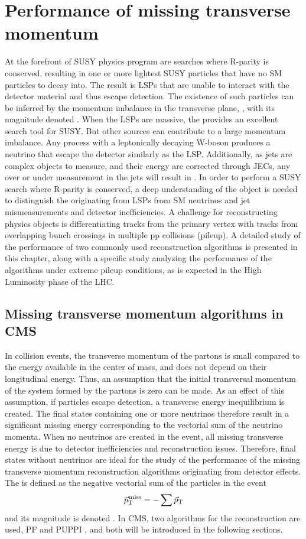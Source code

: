 \chapter{Performance of missing transverse momentum}\label{sec:met}
At the forefront of SUSY physics program are searches where R-parity is conserved, resulting in one or more lightest SUSY particles that have no SM particles to decay into. 
The result is LSPs that are unable to interact with the detector material and thus escape detection.
The existence of such particles can be inferred by the momentum imbalance in the transverse plane, \ptvecmiss, with its magnitude denoted \ptmiss. 
When the LSPs are massive, the \ptmiss provides an excellent search tool for SUSY. But other sources can contribute to a large momentum imbalance. 
Any process with a leptonically decaying W-boson produces a neutrino that escape the detector similarly as the LSP. 
Additionally, as jets are complex objects to measure, and their energy are corrected through JECs, any over or under measurement in the jets will result in \ptmiss. 
In order to perform a SUSY search where R-parity is conserved, a deep understanding of the \ptmiss object is needed to distinguish the \ptmiss originating from LSPs from SM neutrinos and jet mismeasurements and detector inefficiencies. 
A challenge for reconstructing physics objects is differentiating tracks from the primary vertex with tracks from overlapping bunch crossings in multiple pp collisions (pileup). 
A detailed study of the performance of two commonly used \ptmiss reconstruction algorithms is presented in this chapter, along with a specific study analyzing the performance of the algorithms under extreme pileup conditions, as is expected in the High Luminosity phase of the LHC.    
\section{Missing transverse momentum algorithms in CMS}
\label{sec:introduction}
In collision events, the transverse momentum of the partons is small compared to the energy available in the center of mass, and does not depend on their longitudinal energy. 
Thus, an assumption that the initial transversal momentum of the system formed by the partons is zero can be made. 
As an effect of this assumption, if particles escape detection, a transverse energy inequilibrium is created. 
The final states containing one or more neutrinos therefore result in a significant missing energy corresponding to the vectorial sum of the neutrino momenta. 
When no neutrinos are created in the event, all missing transverse energy is due to detector inefficiencies and reconstruction issues. 
Therefore, final states without neutrinos are ideal for the study of the performance of the missing transverse momentum reconstruction algorithms originating from detector effects.
The \ptmiss is defined as the negative vectorial sum of the particles in the event
\begin{equation}
{\vec p}_{\mathrm{T}}^{\kern1pt\text{miss}} =- \sum \vec{p}_{\mathrm{T}}
\end{equation}                                                                      
and its magnitude is denoted \ptmiss. 
In CMS, two algorithms for the \ptmiss reconstruction are used, PF \ptmiss and PUPPI \ptmiss, and both will be introduced in the following sections. 
